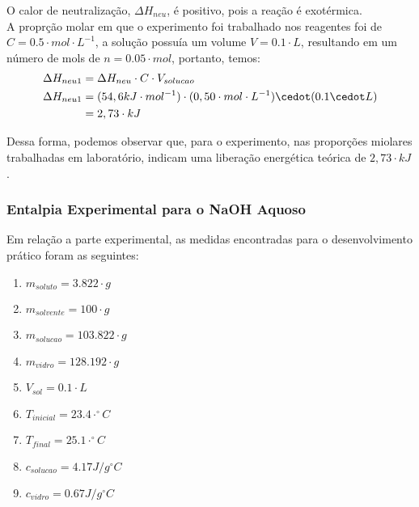             \indent O calor de neutralização, $\Delta{H_{neu}}$, é positivo, pois a reação é exotérmica.\\
            \indent A proprção molar em que o experimento foi trabalhado nos reagentes foi de $C = 0.5 \cdot mol \cdot L^{-1}$, a solução possuía um volume $V = 0.1\cdot L$, resultando em um número de mols de $n = 0.05 \cdot mol$, portanto, temos:\\
            \begin{equation}
                \begin{split}
                	\notag
                    \Delta{H_{neu1}} &= \Delta{H_{neu}} \cdot C \cdot V_{solucao}\\
                    \Delta{H_{neu1}} &=(54,6 kJ \cdot mol^{-1}) \cdot (0,50 \cdot mol \cdot L^{-1}) \cedot (0.1 \cedot L) \\
                    &= 2,73 \cdot kJ\\
                \end{split}
            \end{equation}
        
        	\indent Dessa forma, podemos observar que, para o experimento, nas proporções miolares trabalhadas em laboratório, indicam uma liberação energética teórica de $2,73 \cdot kJ$.\
        
        	\subsubsection{Entalpia Experimental para o NaOH Aquoso}
            
            \indent Em relação a parte experimental, as medidas encontradas para o desenvolvimento prático foram as seguintes:\
            \begin{enumerate}
            	\item $m_{soluto} = 3.822 \cdot g$
                \item $m_{solvente} = 100 \cdot g$
                \item $m_{solucao} = 103.822 \cdot g$
                \item $m_{vidro} = 128.192 \cdot g$
                \item $V_{sol} = 0.1 \cdot L$
                \item $T_{inicial} = 23.4 \cdot ^{\circ}C$
                \item $T_{final} = 25.1 \cdot ^{\circ}C$
                \item $c_{solucao} = 4.17 J /g ^{\circ}C$
                \item $c_{vidro} = 0.67 J / g ^{\circ}C$
            \end{enumerate}
        

